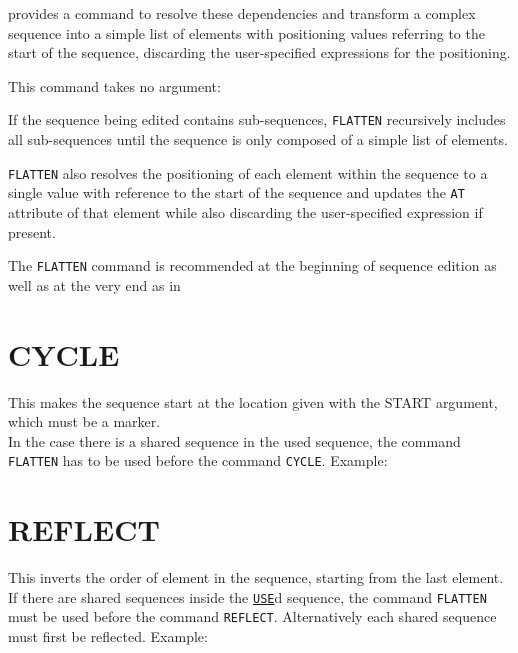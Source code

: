 \madx provides a command to resolve these dependencies and transform a complex 
sequence into a simple list of elements with positioning values referring to 
the start of the sequence, discarding the user-specified expressions for the 
positioning.

This command takes no argument: 

If the sequence being edited contains sub-sequences, {\tt FLATTEN} recursively 
includes all sub-sequences until the sequence is only composed of a simple list 
of elements. 

{\tt FLATTEN} also resolves the positioning of each element within the sequence 
to a single value with reference to the start of the sequence and updates the 
{\tt AT} attribute of that element while also discarding the user-specified 
expression if present.

The {\tt FLATTEN} command is recommended at the beginning of sequence edition 
as well as at the very end as in

\section{CYCLE}
\label{sec:cycle}
This makes the sequence start at the location given with the START
argument, which must be a marker. \\ 
In the case there is a shared sequence in the used sequence, the
command {\tt FLATTEN} has to be used before the command {\tt CYCLE}. 
Example:  

\section{REFLECT}
\label{sec:reflect}
This inverts the order of element in the sequence, starting from the
last element. \\ 
If there are shared sequences inside the \hyperref[sec:use]{\tt USE}d sequence, 
the command
{\tt FLATTEN} must be used before the command {\tt REFLECT}.  
Alternatively each shared sequence must first be reflected. Example:   


